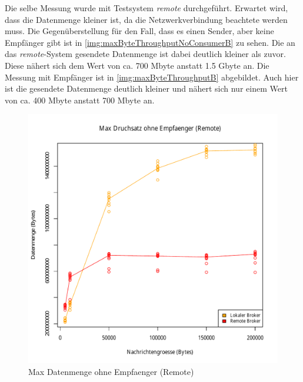 
Die selbe Messung wurde mit Testsystem \textit{remote} durchgeführt. Erwartet wird, dass die Datenmenge kleiner ist, da die Netzwerkverbindung beachtete werden muss. 
Die Gegenüberstellung für den Fall, dass es einen Sender, aber keine Empfänger gibt ist in \autoref{img:maxByteThroughputNoConsumerB} zu sehen. Die an das \textit{remote}-System gesendete Datenmenge ist dabei deutlich kleiner als zuvor. Diese nähert sich dem Wert von ca. 700 Mbyte anstatt 1.5 Gbyte an. Die Messung mit Empfänger ist in \autoref{img:maxByteThroughputB} abgebildet. Auch hier ist die gesendete Datenmenge deutlich kleiner und nähert sich nur einem Wert von ca. 400 Mbyte anstatt 700 Mbyte an.
\begin{figure}
\center
 \includegraphics[width=1\textwidth]{images/measurement/rate-limit-unlimited-no-consumer-AvsB.pdf}
  \caption{Max Datenmenge ohne Empfaenger (Remote)}
  \label{img:maxByteThroughputNoConsumerB}
\end{figure}
